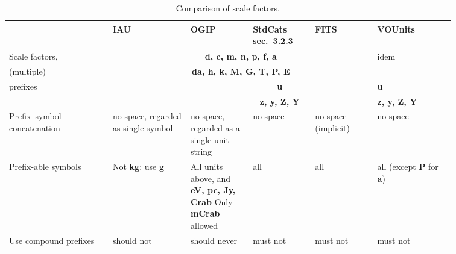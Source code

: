 \documentclass[11pt,notitlepage,onecolumn]{ivoa}
\newcommand{\unit}[1]{\textbf{\textsf{\color{orange}#1}}}
\def\micro{{\symbo \char109}}
\begin{document}

\begin{table}[ht]
\begin{tabular}{|p{0.2\linewidth}|p{0.15\linewidth}|p{0.12\linewidth}|p{0.12\linewidth}|p{0.12\linewidth}|p{0.15\linewidth}|}
\hline
    & IAU & OGIP & StdCats sec.~3.2.3 & FITS & VOUnits\\\hline
    Scale factors,   & \multicolumn{4}{c|}{\unit{d, c, m, n, p, f, a}} & idem \\
    (multiple) & \multicolumn{4}{c|}{\unit{da, h, k, M, G, T, P, E}}  & \\
    prefixes & \unit{\micro} & \multicolumn{3}{c|}{\unit{u}} & \unit{u}\\
     &  & \multicolumn{3}{c|}{\unit{z, y, Z, Y}} & \unit{z, y, Z, Y}\\\hline
    Prefix--symbol concatenation & no space, regarded as single symbol\raggedright & no space, regarded as a single unit string\raggedright & no space & no space (implicit)\raggedright & no space\\\hline
    Prefix-able symbols  & Not \unit{kg}: use \unit{g}\raggedright & All units above, and \unit{eV, pc, Jy, Crab} Only \unit{mCrab} allowed\raggedright & all & all & all (except \unit{P} for \unit{a})\\\hline
    Use compound prefixes & should not & should never & must not & must not & must not\\\hline
\end{tabular}
  \caption{Comparison of scale factors.}
  \label{tabx:comparUnitScale}
\end{table}



\end{document}

